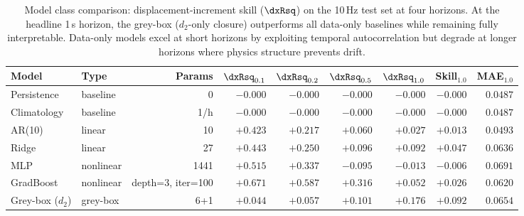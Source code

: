 \begin{table}[htbp]
  \centering
  \caption{Model class comparison: displacement-increment skill
           ($\dxRsq$) on the 10\,Hz test set at four horizons.
           At the headline 1\,s horizon, the grey-box ($d_2$-only
           closure) outperforms all data-only baselines while remaining
           fully interpretable.  Data-only models excel at short
           horizons by exploiting temporal autocorrelation but degrade
           at longer horizons where physics structure prevents drift.}
  \label{tab:baseline_comparison}
  \begin{tabular}{llrrrrrrr}
    \toprule
    Model & Type & Params & $\dxRsq_{0.1}$ & $\dxRsq_{0.2}$ & $\dxRsq_{0.5}$ & $\dxRsq_{1.0}$ & Skill$_{1.0}$ & MAE$_{1.0}$ \\
    \midrule
    Persistence & baseline & 0 & $-0.000$ & $-0.000$ & $-0.000$ & $-0.000$ & $-0.000$ & $0.0487$ \\
    Climatology & baseline & 1/h & $-0.000$ & $-0.000$ & $-0.000$ & $-0.000$ & $-0.000$ & $0.0487$ \\
    AR(10) & linear & 10 & $+0.423$ & $+0.217$ & $+0.060$ & $+0.027$ & $+0.013$ & $0.0493$ \\
    Ridge & linear & ~27 & $+0.443$ & $+0.250$ & $+0.096$ & $+0.092$ & $+0.047$ & $0.0636$ \\
    MLP & nonlinear & ~1441 & $+0.515$ & $+0.337$ & $-0.095$ & $-0.013$ & $-0.006$ & $0.0691$ \\
    GradBoost & nonlinear & depth=3, iter=100 & $+0.671$ & $+0.587$ & $+0.316$ & $+0.052$ & $+0.026$ & $0.0620$ \\
    \midrule
    Grey-box ($d_2$) & grey-box & 6+1 & $+0.044$ & $+0.057$ & $+0.101$ & $+0.176$ & $+0.092$ & $0.0654$ \\
    \bottomrule
  \end{tabular}
\end{table}
